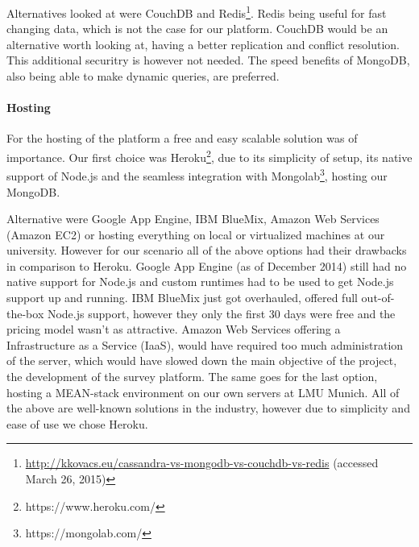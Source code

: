 {		Alternatives looked at were CouchDB and Redis\footnote{\url{http://kkovacs.eu/cassandra-vs-mongodb-vs-couchdb-vs-redis} (accessed March 26, 2015)}. Redis being useful for fast changing data, which is not the case for our platform. CouchDB would be an alternative worth looking at, having a better replication and conflict resolution. This additional securitry is however not needed. The speed benefits of MongoDB, also being able to make dynamic queries, are preferred.





	\paragraph{Hosting}

		For the hosting of the platform a free and easy scalable solution was of importance. Our first choice was Heroku\footnote{https://www.heroku.com/}, due to its simplicity of setup, its native support of Node.js and the seamless integration with Mongolab\footnote{https://mongolab.com/}, hosting our MongoDB.





		Alternative were Google App Engine, IBM BlueMix, Amazon Web Services (Amazon EC2) or hosting everything on local or virtualized machines at our university. However for our scenario all of the above options had their drawbacks in comparison to Heroku. Google App Engine (as of December 2014) still had no native support for Node.js and custom runtimes had to be used to get Node.js support up and running. IBM BlueMix just got overhauled, offered full out-of-the-box Node.js support, however they only the first 30 days were free and the pricing model wasn't as attractive. Amazon Web Services offering a Infrastructure as a Service (IaaS), would have required too much administration of the server, which would have slowed down the main objective of the project, the development of the survey platform. The same goes for the last option, hosting a MEAN-stack environment on our own servers at LMU Munich. All of the above are well-known solutions in the industry, however due to simplicity and ease of use we chose Heroku.


}
